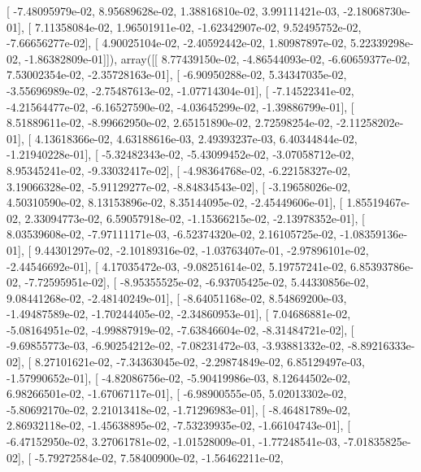 \documentclass{article}
\begin{document}
       [ -7.48095979e-02,   8.95689628e-02,   1.38816810e-02,
          3.99111421e-03,  -2.18068730e-01],
       [  7.11358084e-02,   1.96501911e-02,  -1.62342907e-02,
          9.52495752e-02,  -7.66656277e-02],
       [  4.90025104e-02,  -2.40592442e-02,   1.80987897e-02,
          5.22339298e-02,  -1.86382809e-01]]), array([[  8.77439150e-02,  -4.86544093e-02,  -6.60659377e-02,
          7.53002354e-02,  -2.35728163e-01],
       [ -6.90950288e-02,   5.34347035e-02,  -3.55696989e-02,
         -2.75487613e-02,  -1.07714304e-01],
       [ -7.14522341e-02,  -4.21564477e-02,  -6.16527590e-02,
         -4.03645299e-02,  -1.39886799e-01],
       [  8.51889611e-02,  -8.99662950e-02,   2.65151890e-02,
          2.72598254e-02,  -2.11258202e-01],
       [  4.13618366e-02,   4.63188616e-03,   2.49393237e-03,
          6.40344844e-02,  -1.21940228e-01],
       [ -5.32482343e-02,  -5.43099452e-02,  -3.07058712e-02,
          8.95345241e-02,  -9.33032417e-02],
       [ -4.98364768e-02,  -6.22158327e-02,   3.19066328e-02,
         -5.91129277e-02,  -8.84834543e-02],
       [ -3.19658026e-02,   4.50310590e-02,   8.13153896e-02,
          8.35144095e-02,  -2.45449606e-01],
       [  1.85519467e-02,   2.33094773e-02,   6.59057918e-02,
         -1.15366215e-02,  -2.13978352e-01],
       [  8.03539608e-02,  -7.97111171e-03,  -6.52374320e-02,
          2.16105725e-02,  -1.08359136e-01],
       [  9.44301297e-02,  -2.10189316e-02,  -1.03763407e-01,
         -2.97896101e-02,  -2.44546692e-01],
       [  4.17035472e-03,  -9.08251614e-02,   5.19757241e-02,
          6.85393786e-02,  -7.72595951e-02],
       [ -8.95355525e-02,  -6.93705425e-02,   5.44330856e-02,
          9.08441268e-02,  -2.48140249e-01],
       [ -8.64051168e-02,   8.54869200e-03,  -1.49487589e-02,
         -1.70244405e-02,  -2.34860953e-01],
       [  7.04686881e-02,  -5.08164951e-02,  -4.99887919e-02,
         -7.63846604e-02,  -8.31484721e-02],
       [ -9.69855773e-03,  -6.90254212e-02,  -7.08231472e-03,
         -3.93881332e-02,  -8.89216333e-02],
       [  8.27101621e-02,  -7.34363045e-02,  -2.29874849e-02,
          6.85129497e-03,  -1.57990652e-01],
       [ -4.82086756e-02,  -5.90419986e-03,   8.12644502e-02,
          6.98266501e-02,  -1.67067117e-01],
       [ -6.98900555e-05,   5.02013302e-02,  -5.80692170e-02,
          2.21013418e-02,  -1.71296983e-01],
       [ -8.46481789e-02,   2.86932118e-02,  -1.45638895e-02,
         -7.53239935e-02,  -1.66104743e-01],
       [ -6.47152950e-02,   3.27061781e-02,  -1.01528009e-01,
         -1.77248541e-03,  -7.01835825e-02],
       [ -5.79272584e-02,   7.58400900e-02,  -1.56462211e-02,
\end{document}
